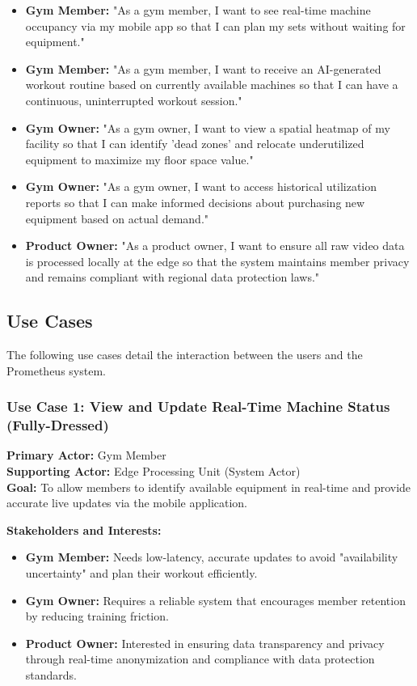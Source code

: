 \begin{itemize}
    \item \textbf{Gym Member:} "As a gym member, I want to see real-time machine occupancy via my mobile app so that I can plan my sets without waiting for equipment."
    \item \textbf{Gym Member:} "As a gym member, I want to receive an AI-generated workout routine based on currently available machines so that I can have a continuous, uninterrupted workout session."
    \item \textbf{Gym Owner:} "As a gym owner, I want to view a spatial heatmap of my facility so that I can identify 'dead zones' and relocate underutilized equipment to maximize my floor space value."
    \item \textbf{Gym Owner:} "As a gym owner, I want to access historical utilization reports so that I can make informed decisions about purchasing new equipment based on actual demand."
    \item \textbf{Product Owner:} "As a product owner, I want to ensure all raw video data is processed locally at the edge so that the system maintains member privacy and remains compliant with regional data protection laws."
\end{itemize}

\subsection{Use Cases}

The following use cases detail the interaction between the users and the Prometheus system.

\subsubsection{Use Case 1: View and Update Real-Time Machine Status (Fully-Dressed)}
\textbf{Primary Actor:} Gym Member \\
\textbf{Supporting Actor:} Edge Processing Unit (System Actor) \\
\textbf{Goal:} To allow members to identify available equipment in real-time and provide accurate live updates via the mobile application.

\textbf{Stakeholders and Interests:}
\begin{itemize}
    \item \textbf{Gym Member:} Needs low-latency, accurate updates to avoid "availability uncertainty" and plan their workout efficiently.
    \item \textbf{Gym Owner:} Requires a reliable system that encourages member retention by reducing training friction.
    \item \textbf{Product Owner:} Interested in ensuring data transparency and privacy through real-time anonymization and compliance with data protection standards.
\end{itemize}

